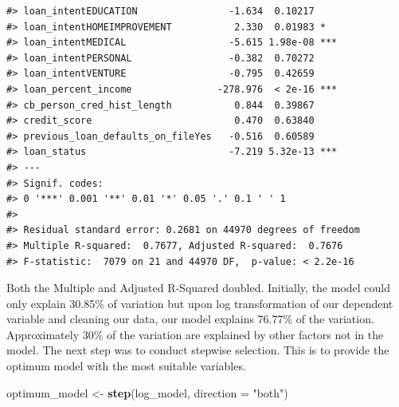 \documentclass[
  10pt,
]{article}
\newenvironment{Shaded}{\begin{snugshade}}{\end{snugshade}}
\newcommand{\AttributeTok}[1]{\textcolor[rgb]{0.13,0.29,0.53}{#1}}
\newcommand{\FunctionTok}[1]{\textcolor[rgb]{0.13,0.29,0.53}{\textbf{#1}}}
\newcommand{\NormalTok}[1]{#1}
\newcommand{\OtherTok}[1]{\textcolor[rgb]{0.56,0.35,0.01}{#1}}
\newcommand{\StringTok}[1]{\textcolor[rgb]{0.31,0.60,0.02}{#1}}
\begin{document}
\begin{verbatim}
#> loan_intentEDUCATION                -1.634  0.10217    
#> loan_intentHOMEIMPROVEMENT           2.330  0.01983 *  
#> loan_intentMEDICAL                  -5.615 1.98e-08 ***
#> loan_intentPERSONAL                 -0.382  0.70272    
#> loan_intentVENTURE                  -0.795  0.42659    
#> loan_percent_income               -278.976  < 2e-16 ***
#> cb_person_cred_hist_length           0.844  0.39867    
#> credit_score                         0.470  0.63840    
#> previous_loan_defaults_on_fileYes   -0.516  0.60589    
#> loan_status                         -7.219 5.32e-13 ***
#> ---
#> Signif. codes:  
#> 0 '***' 0.001 '**' 0.01 '*' 0.05 '.' 0.1 ' ' 1
#> 
#> Residual standard error: 0.2681 on 44970 degrees of freedom
#> Multiple R-squared:  0.7677, Adjusted R-squared:  0.7676 
#> F-statistic:  7079 on 21 and 44970 DF,  p-value: < 2.2e-16
\end{verbatim}

Both the Multiple and Adjusted R-Squared doubled. Initially, the model
could only explain 30.85\% of variation but upon log transformation of
our dependent variable and cleaning our data, our model explains 76.77\%
of the variation. Approximately 30\% of the variation are explained by
other factors not in the model. The next step was to conduct stepwise
selection. This is to provide the optimum model with the most suitable
variables.\\

\begin{Shaded}
\begin{Highlighting}[]
\NormalTok{optimum\_model }\OtherTok{\textless{}{-}} \FunctionTok{step}\NormalTok{(log\_model, }\AttributeTok{direction =} \StringTok{"both"}\NormalTok{)}
\end{Highlighting}
\end{Shaded}
\end{document}
